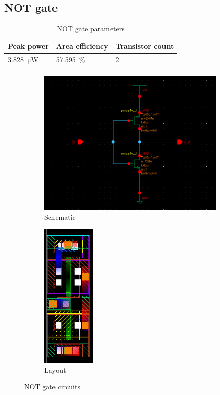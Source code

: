 \subsection{NOT gate}
\begin{xltabular}{\textwidth}{YYY}
    \hline
    Peak power & Area efficiency & Transistor count \\
    \hline
    \qty{3.828}{\uW} & \qty{57.595}{\percent} & 2  \\
    \hline    
    \caption{NOT gate parameters}
\end{xltabular}
\begin{figure}[H]
\begin{subfigure}{0.6\textwidth}
    \centering
    \includegraphics[width=\textwidth,height=7cm,keepaspectratio]{./figures/inverter/schematic.png}
    \caption{Schematic}\label{fig:notschematic}
\end{subfigure}
\hfill
\begin{subfigure}{0.4\textwidth}
    \centering
    \includegraphics[width=\textwidth,height=7cm,keepaspectratio]{./figures/inverter/layout.png}
    \caption{Layout}\label{fig:notlayout}
\end{subfigure}
\caption{NOT gate circuits}
\end{figure}

